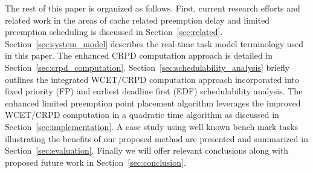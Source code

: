 The rest of this paper is organized as follows. First, current research efforts and related work in the areas of cache related preemption delay and limited preemption scheduling is discussed in Section~\ref{sec:related}.  Section~\ref{sec:system_model} describes the real-time task model terminology used in this paper.  The enhanced CRPD computation approach is detailed in Section~\ref{sec:crpd_computation}. Section~\ref{sec:schedulability_analysis} briefly outlines the integrated WCET/CRPD computation approach incorporated into fixed priority (FP) and earliest deadline first (EDF) schedulability analysis.  The enhanced limited preemption point placement algorithm leverages the improved WCET/CRPD computation in a quadratic time algorithm as discussed in Section~\ref{sec:implementation}.  A case study using well known bench mark tasks illustrating the benefits of our proposed method are presented and summarized in Section~\ref{sec:evaluation}.  Finally we will offer relevant conclusions along with proposed future work in Section~\ref{sec:conclusion}. 